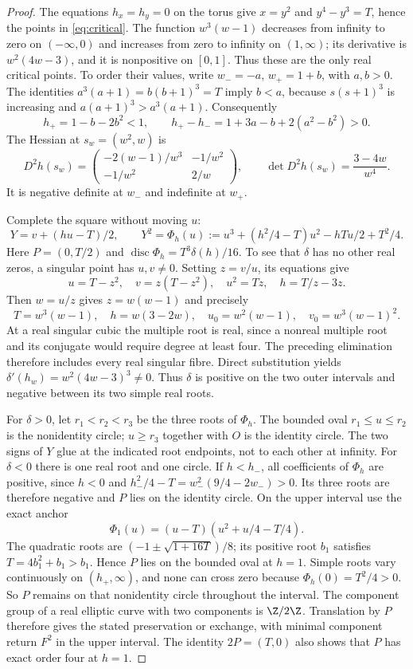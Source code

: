 \begin{proof}
The equations $h_x=h_y=0$ on the torus give $x=y^2$ and
$y^4-y^3=T$, hence the points in \eqref{eq:critical}.
The function $w^3(w-1)$ decreases from infinity to zero on
$(-\infty,0)$ and increases from zero to infinity on $(1,\infty)$;
its derivative is $w^2(4w-3)$, and it is nonpositive on $[0,1]$.
Thus these are the only real critical points. To order their values,
write $w_-=-a$, $w_+=1+b$, with $a,b>0$. The identities
$a^3(a+1)=b(b+1)^3=T$ imply $b<a$, because
$s(s+1)^3$ is increasing and $a(a+1)^3>a^3(a+1)$. Consequently
\[
 h_+=1-b-2b^2<1,\qquad
 h_+-h_-=1+3a-b+2(a^2-b^2)>0.
\]
The Hessian at $s_w=(w^2,w)$ is
\[
 D^2h(s_w)=
 \begin{pmatrix}-2(w-1)/w^3&-1/w^2\\-1/w^2&2/w\end{pmatrix},
 \qquad \det D^2h(s_w)=\frac{3-4w}{w^4}.
\]
It is negative definite at $w_-$ and indefinite at $w_+$.

Complete the square without moving $u$:
\begin{equation}
 Y=v+(hu-T)/2,\qquad
 Y^2=\Phi_h(u):=u^3+(h^2/4-T)u^2-hTu/2+T^2/4.
 \label{surf:completed-square}
\end{equation}
Here $P=(0,T/2)$ and $\operatorname{disc}\Phi_h=T^3\delta(h)/16$.
To see that $\delta$ has no other real zeros, a singular point has
$u,v\ne0$. Setting $z=v/u$, its equations give
\[
 u=T-z^2,\quad v=z(T-z^2),\quad u^2=Tz,\quad h=T/z-3z.
\]
Then $w=u/z$ gives $z=w(w-1)$ and precisely
\[
 T=w^3(w-1),\quad h=w(3-2w),\quad
 u_0=w^2(w-1),\quad v_0=w^3(w-1)^2.
\]
At a real singular cubic the multiple root is real, since a nonreal
multiple root and its conjugate would require degree at least four.
The preceding elimination therefore includes every real singular fibre.
Direct substitution yields
$\delta'(h_w)=w^2(4w-3)^3\ne0$.
Thus $\delta$ is positive on the two outer intervals and negative
between its two simple real roots.

For $\delta>0$, let $r_1<r_2<r_3$ be the three roots of $\Phi_h$.
The bounded oval $r_1\le u\le r_2$ is the nonidentity circle;
$u\ge r_3$ together with $O$ is the identity circle. The two signs
of $Y$ glue at the indicated root endpoints, not to each other at
infinity. For $\delta<0$ there is one real root and one circle.
If $h<h_-$, all coefficients of $\Phi_h$ are positive, since
$h<0$ and $h_-^2/4-T=w_-^2(9/4-2w_-)>0$.
Its three roots are therefore negative and $P$ lies on the identity
circle. On the upper interval use the exact anchor
\[
 \Phi_1(u)=(u-T)(u^2+u/4-T/4).
\]
The quadratic roots are $(-1\pm\sqrt{1+16T})/8$; its positive root
$b_1$ satisfies $T=4b_1^2+b_1>b_1$. Hence $P$ lies on the bounded
oval at $h=1$. Simple roots vary continuously on $(h_+,\infty)$,
and none can cross zero because $\Phi_h(0)=T^2/4>0$.
So $P$ remains on that nonidentity circle throughout the interval.
The component group of a real elliptic curve with two components
is $\Z/2\Z$. Translation by $P$ therefore gives the stated
preservation or exchange, with minimal component return $F^2$ in
the upper interval. The identity $2P=(T,0)$ also shows that $P$
has exact order four at $h=1$.


\end{proof}
